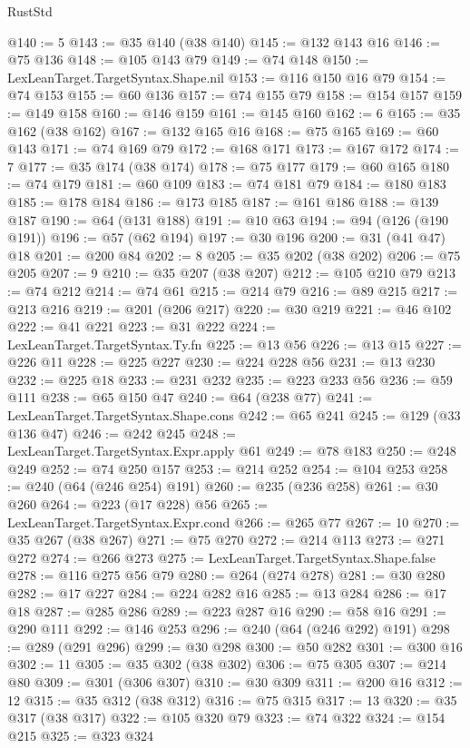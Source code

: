 \begin{lexlean}{RustStd}
\begin{coremodule}
@140 := 5
@143 := @35 @140 (@38 @140)
@145 := @132 @143 @16
@146 := @75 @136
@148 := @105 @143 @79
@149 := @74 @148
@150 := LexLeanTarget.TargetSyntax.Shape.nil
@153 := @116 @150 @16 @79
@154 := @74 @153
@155 := @60 @136
@157 := @74 @155 @79
@158 := @154 @157
@159 := @149 @158
@160 := @146 @159
@161 := @145 @160
@162 := 6
@165 := @35 @162 (@38 @162)
@167 := @132 @165 @16
@168 := @75 @165
@169 := @60 @143
@171 := @74 @169 @79
@172 := @168 @171
@173 := @167 @172
@174 := 7
@177 := @35 @174 (@38 @174)
@178 := @75 @177
@179 := @60 @165
@180 := @74 @179
@181 := @60 @109
@183 := @74 @181 @79
@184 := @180 @183
@185 := @178 @184
@186 := @173 @185
@187 := @161 @186
@188 := @139 @187
@190 := @64 (@131 @188)
@191 := @10 @63
@194 := @94 (@126 (@190 @191))
@196 := @57 (@62 @194)
@197 := @30 @196
@200 := @31 (@41 @47) @18
@201 := @200 @84
@202 := 8
@205 := @35 @202 (@38 @202)
@206 := @75 @205
@207 := 9
@210 := @35 @207 (@38 @207)
@212 := @105 @210 @79
@213 := @74 @212
@214 := @74 @61
@215 := @214 @79
@216 := @89 @215
@217 := @213 @216
@219 := @201 (@206 @217)
@220 := @30 @219
@221 := @46 @102
@222 := @41 @221
@223 := @31 @222
@224 := LexLeanTarget.TargetSyntax.Ty.fn
@225 := @13 @56
@226 := @13 @15
@227 := @226 @11
@228 := @225 @227
@230 := @224 @228 @56
@231 := @13 @230
@232 := @225 @18
@233 := @231 @232
@235 := @223 @233 @56
@236 := @59 @111
@238 := @65 @150 @47
@240 := @64 (@238 @77)
@241 := LexLeanTarget.TargetSyntax.Shape.cons
@242 := @65 @241
@245 := @129 (@33 @136 @47)
@246 := @242 @245
@248 := LexLeanTarget.TargetSyntax.Expr.apply @61
@249 := @78 @183
@250 := @248 @249
@252 := @74 @250 @157
@253 := @214 @252
@254 := @104 @253
@258 := @240 (@64 (@246 @254) @191)
@260 := @235 (@236 @258)
@261 := @30 @260
@264 := @223 (@17 @228) @56
@265 := LexLeanTarget.TargetSyntax.Expr.cond
@266 := @265 @77
@267 := 10
@270 := @35 @267 (@38 @267)
@271 := @75 @270
@272 := @214 @113
@273 := @271 @272
@274 := @266 @273
@275 := LexLeanTarget.TargetSyntax.Shape.false
@278 := @116 @275 @56 @79
@280 := @264 (@274 @278)
@281 := @30 @280
@282 := @17 @227
@284 := @224 @282 @16
@285 := @13 @284
@286 := @17 @18
@287 := @285 @286
@289 := @223 @287 @16
@290 := @58 @16
@291 := @290 @111
@292 := @146 @253
@296 := @240 (@64 (@246 @292) @191)
@298 := @289 (@291 @296)
@299 := @30 @298
@300 := @50 @282
@301 := @300 @16
@302 := 11
@305 := @35 @302 (@38 @302)
@306 := @75 @305
@307 := @214 @80
@309 := @301 (@306 @307)
@310 := @30 @309
@311 := @200 @16
@312 := 12
@315 := @35 @312 (@38 @312)
@316 := @75 @315
@317 := 13
@320 := @35 @317 (@38 @317)
@322 := @105 @320 @79
@323 := @74 @322
@324 := @154 @215
@325 := @323 @324

\end{coremodule}
\end{lexlean}
